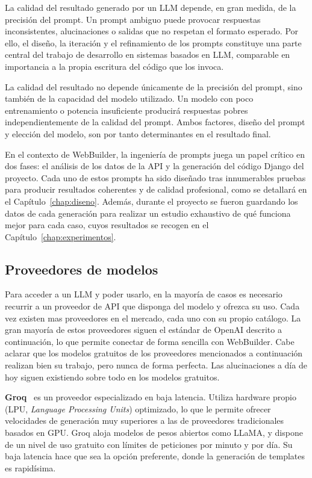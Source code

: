 La calidad del resultado generado por un LLM depende, en gran medida, de la precisión del prompt. Un prompt ambiguo puede provocar respuestas inconsistentes, alucinaciones o salidas que no respetan el formato esperado. Por ello, el diseño, la iteración y el refinamiento de los prompts constituye una parte central del trabajo de desarrollo en sistemas basados en LLM, comparable en importancia a la propia escritura del código que los invoca.

La calidad del resultado no depende únicamente de la precisión del prompt, sino también de la capacidad del modelo utilizado. Un modelo con poco entrenamiento 
o potencia insuficiente producirá respuestas pobres independientemente de la calidad del prompt. Ambos factores, diseño del prompt y elección del modelo, son por tanto determinantes en el resultado final.

En el contexto de WebBuilder, la ingeniería de prompts juega un papel crítico en dos fases: el análisis de los datos de la API y la generación del código Django del proyecto. Cada uno de estos prompts ha sido diseñado tras innumerables pruebas para producir resultados coherentes y de calidad profesional, como se detallará en el Capítulo~\ref{chap:diseno}. Además, durante el proyecto se fueron guardando los datos de cada generación para realizar un estudio exhaustivo de qué funciona mejor para cada caso, cuyos resultados se recogen en el Capítulo~\ref{chap:experimentos}.


\subsection{Proveedores de modelos}
\label{subsec:proveedores}

Para acceder a un LLM y poder usarlo, en la mayoría de casos es necesario recurrir a un proveedor de API que disponga del modelo y ofrezca su uso. Cada vez existen mas proveedores en el mercado, cada uno con su propio catálogo. La gran mayoría de estos proveedores siguen el estándar de OpenAI descrito a continuación, lo que permite conectar de forma sencilla con WebBuilder. Cabe aclarar que los modelos gratuitos de los proveedores mencionados a continuación realizan bien su trabajo, pero nunca de forma perfecta. Las alucinaciones a día de hoy siguen existiendo sobre todo en los modelos gratuitos.

\textbf{Groq}~\cite{groq_docs} es un proveedor especializado en baja latencia. Utiliza hardware propio (LPU, \emph{Language Processing Units}) optimizado, lo que le permite ofrecer velocidades de generación muy superiores a las de proveedores tradicionales basados en GPU. Groq aloja modelos de pesos abiertos como LLaMA, y dispone de un nivel de uso gratuito con límites de peticiones por minuto y por día. Su baja latencia hace que sea la opción preferente, donde la generación de templates es rapidísima.

